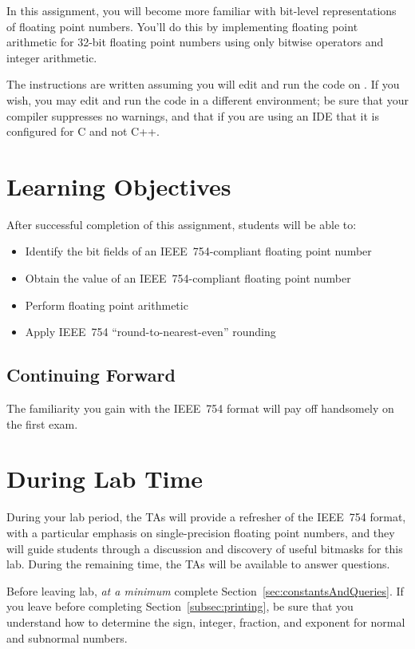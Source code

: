 In this assignment, you will become more familiar with bit-level representations of floating point numbers.
You'll do this by implementing floating point arithmetic for 32-bit floating point numbers using only bitwise operators and integer arithmetic.

The instructions are written assuming you will edit and run the code on \runtimeenvironment.
If you wish, you may edit and run the code in a different environment;
be sure that your compiler suppresses no warnings, and that if you are using an IDE that it is configured for C and not C++.

\section*{Learning Objectives}

After successful completion of this assignment, students will be able to:
\begin{itemize}
    \item Identify the bit fields of an IEEE~754-compliant floating point number
    \item Obtain the value of an IEEE~754-compliant floating point number
    \item Perform floating point arithmetic
    \item Apply IEEE~754 ``round-to-nearest-even'' rounding
\end{itemize}

\subsection*{Continuing Forward}

The familiarity you gain with the IEEE~754 format will pay off handsomely on the first exam.

\section*{During Lab Time}

During your lab period, the TAs will provide a refresher of the IEEE~754 format, with a particular emphasis on single-precision floating point numbers, and they will guide students through a discussion and discovery of useful bitmasks for this lab.
During the remaining time, the TAs will be available to answer questions.

Before leaving lab, \textit{at a minimum} complete Section~\ref{sec:constantsAndQueries}.
If you leave before completing Section~\ref{subsec:printing}, be sure that you understand how to determine the sign, integer, fraction, and exponent for normal and subnormal numbers.
